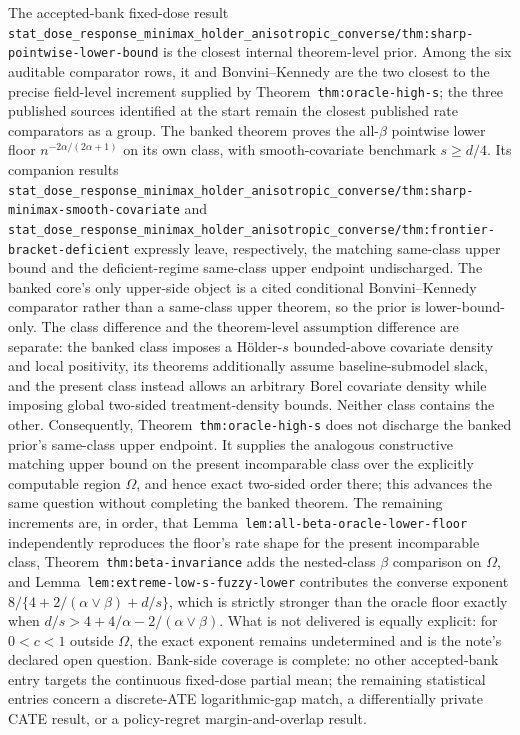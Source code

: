 \documentclass{article}
\begin{document}
The accepted-bank fixed-dose result \texttt{stat\_dose\_response\_minimax\_holder\_anisotropic\_converse/thm:sharp-pointwise-lower-bound} is the closest internal theorem-level prior. Among the six auditable comparator rows, it and Bonvini--Kennedy are the two closest to the precise field-level increment supplied by Theorem~\texttt{thm:oracle-high-s}; the three published sources identified at the start remain the closest published rate comparators as a group. The banked theorem proves the all-\(\beta\) pointwise lower floor \(n^{-2\alpha/(2\alpha+1)}\) on its own class, with smooth-covariate benchmark \(s\ge d/4\). Its companion results \texttt{stat\_dose\_response\_minimax\_holder\_anisotropic\_converse/thm:sharp-minimax-smooth-covariate} and \texttt{stat\_dose\_response\_minimax\_holder\_anisotropic\_converse/thm:frontier-bracket-deficient} expressly leave, respectively, the matching same-class upper bound and the deficient-regime same-class upper endpoint undischarged. The banked core's only upper-side object is a cited conditional Bonvini--Kennedy comparator rather than a same-class upper theorem, so the prior is lower-bound-only. The class difference and the theorem-level assumption difference are separate: the banked class imposes a H\"older-\(s\) bounded-above covariate density and local positivity, its theorems additionally assume baseline-submodel slack, and the present class instead allows an arbitrary Borel covariate density while imposing global two-sided treatment-density bounds. Neither class contains the other. Consequently, Theorem~\texttt{thm:oracle-high-s} does not discharge the banked prior's same-class upper endpoint. It supplies the analogous constructive matching upper bound on the present incomparable class over the explicitly computable region \(\Omega\), and hence exact two-sided order there; this advances the same question without completing the banked theorem. The remaining increments are, in order, that Lemma~\texttt{lem:all-beta-oracle-lower-floor} independently reproduces the floor's rate shape for the present incomparable class, Theorem~\texttt{thm:beta-invariance} adds the nested-class \(\beta\) comparison on \(\Omega\), and Lemma~\texttt{lem:extreme-low-s-fuzzy-lower} contributes the converse exponent \(8/\{4+2/(\alpha\vee\beta)+d/s\}\), which is strictly stronger than the oracle floor exactly when \(d/s>4+4/\alpha-2/(\alpha\vee\beta)\). What is not delivered is equally explicit: for \(0<c<1\) outside \(\Omega\), the exact exponent remains undetermined and is the note's declared open question. Bank-side coverage is complete: no other accepted-bank entry targets the continuous fixed-dose partial mean; the remaining statistical entries concern a discrete-ATE logarithmic-gap match, a differentially private CATE result, or a policy-regret margin-and-overlap result.
\end{document}

